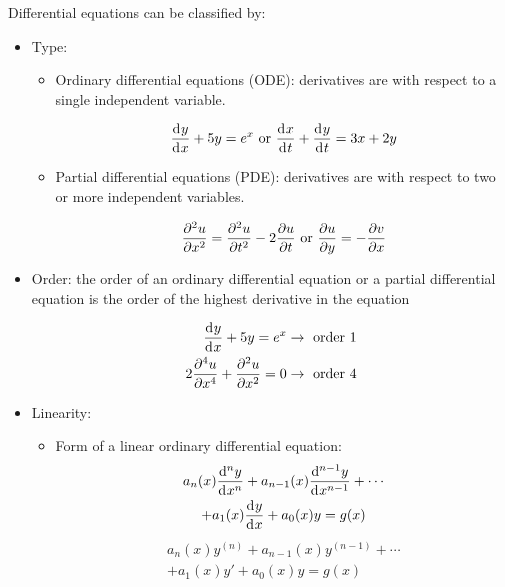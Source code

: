 \documentclass[10pt, twocolumn]{article}
\theoremstyle{definition}
\begin{document}
Differential equations can be classified by:
\begin{itemize}
  \item Type:
        \begin{itemize}
          \item Ordinary differential equations (ODE): derivatives are with respect to a single independent variable.
                \begin{example}
                  \[
                    \frac{\mathrm{d}^{} y}{\mathrm{d}^{} x} + 5y = e^x \text{ or } \frac{\mathrm{d}^{} x}{\mathrm{d}^{} t} + \frac{\mathrm{d}^{} y}{\mathrm{d}^{} t} = 3x + 2y
                  \]
                \end{example}
          \item Partial differential equations (PDE): derivatives are with respect to two or more independent variables.
                \begin{example}
                  \[
                    \frac{\partial^{2} u}{\partial x^{2}} = \frac{\partial^{2} u}{\partial t^{2}} - 2\frac{\partial u}{\partial t} \text{ or } \frac{\partial u}{\partial y} = - \frac{\partial v}{\partial x}
                  \]
                \end{example}
        \end{itemize}
  \item Order: the order of an ordinary differential equation or a partial differential equation is the order of the highest derivative in the equation
        \begin{example}
          \begin{align*}
            \frac{\mathrm{d}^{} y}{\mathrm{d}^{} x} + 5y = e^x                                     & \rightarrow \text{ order 1} \\
            2\frac{\partial^{4} u}{\partial x^{4}} + \frac{\partial^{2} u}{\partial x^{2}} = 0 & \rightarrow \text{ order 4}
          \end{align*}
        \end{example}
  \item Linearity:
        \begin{itemize}
          \item Form of a linear ordinary differential equation:
                \begin{multline*}
                  a_n (x)\frac{\mathrm{d}^{n} y}{\mathrm{d}^{} x^{n}} + a_{n - 1}(x)\frac{\mathrm{d}^{n - 1} y}{\mathrm{d}^{} x^{n - 1}} + \cdots \\
                  + a_1 (x)\frac{\mathrm{d}^{} y}{\mathrm{d}^{} x} + a_0 (x)y = g(x)
                \end{multline*}
                \begin{multline*}
                  a_n (x) y^{(n)} + a_{n - 1}(x) y^{(n - 1)} + \cdots \\
                  + a_1 (x) y' + a_0 (x)y = g(x)
                \end{multline*}


\end{itemize}
\end{itemize}
\end{document}
